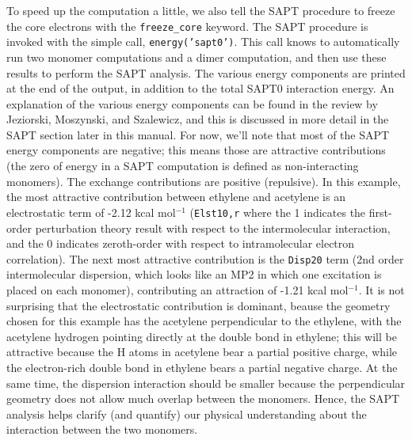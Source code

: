To speed up the computation a little, we also tell the SAPT procedure to
freeze the core electrons with the {\tt freeze\_core} keyword.  The SAPT
procedure is invoked with the simple call, {\tt energy('sapt0')}.  This
call knows to automatically run two monomer computations and a dimer
computation, and then use these results to perform the SAPT analysis.  The
various energy components are printed at the end of the output, in addition
to the total SAPT0 interaction energy.  An explanation of the various
energy components can be found in the review by Jeziorski, Moszynski, and
Szalewicz,\cite{Jeziorski:1994:1887}  and this is discussed in more detail
in the SAPT section later in this manual.  For now, we'll note that most of
the SAPT energy components are negative; this means those are attractive
contributions (the zero of energy in a SAPT computation is defined as
non-interacting monomers).  The exchange contributions are positive
(repulsive).   In this example, the most attractive contribution between
ethylene and acetylene is an electrostatic term of -2.12 kcal mol$^{-1}$
({\tt Elst10,r} where the 1 indicates the first-order
perturbation theory result with respect to the intermolecular interaction,
and the 0 indicates zeroth-order with respect to intramolecular electron
correlation).  The next most attractive contribution is the {\tt Disp20}
term (2nd order intermolecular dispersion, which looks like an MP2 in which
one excitation is placed on each monomer), contributing an attraction of
-1.21 kcal mol$^{-1}$.  It is not surprising that the electrostatic
contribution is dominant, beause the geometry chosen for this example has the
acetylene perpendicular to the ethylene, with the acetylene hydrogen
pointing directly at the double bond in ethylene; this will be attractive
because the H atoms in acetylene bear a partial positive charge, while the
electron-rich double bond in ethylene bears a partial negative charge.  At
the same time, the dispersion interaction should be smaller because the
perpendicular geometry does not allow much overlap between the monomers.
Hence, the SAPT analysis helps clarify (and quantify) our physical
understanding about the interaction between the two monomers. 

